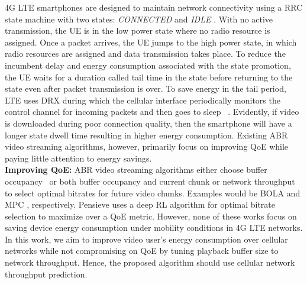 \indent \ac{4G} LTE smartphones are designed to maintain network connectivity using a \ac{RRC} state machine with two states: \textit{CONNECTED} and \textit{IDLE} \cite{Huang2012}. With no active transmission, the \ac{UE} is in the low power  state where no radio resource is assigned.  Once a packet arrives, the  \ac{UE} jumps to the high power  state, in which radio resources are assigned and data transmission takes place.  To reduce the incumbent delay and energy consumption associated with the state promotion, the \ac{UE} waits for a duration called tail time in the  state before returning to the  state even after packet transmission is over. To save energy in the tail period, LTE uses  \ac{DRX} during which the cellular interface periodically monitors the control channel for incoming packets and then goes to sleep ~\cite{Huang2012}. Evidently, if video is downloaded during poor connection quality, then the smartphone will have a longer  state dwell time resulting in higher energy consumption. Existing \ac{ABR} video streaming algorithms, however, primarily focus on improving \ac{QoE} while paying little attention to energy savings.\\
\noindent \textbf{Improving QoE:}
\ac{ABR} video streaming algorithms either choose buffer occupancy~\cite{Huang2014,Spiteri2016}  or both buffer occupancy and current chunk or network throughput~\cite{Yin2015,Jiang2014,Sengupta2018,Xu2015,Mehr2019} to select optimal bitrates for future video chunks. Examples would be BOLA \cite{Spiteri2016} and MPC \cite{Yin2015}, respectively.
Pensieve \cite{mao2017neural} uses a deep RL algorithm for optimal bitrate selection to maximize over a \ac{QoE} metric. However, none of these  works focus on saving device energy consumption under mobility conditions in \ac{4G} LTE networks. \\
\indent In this work, we aim to improve video user's energy consumption over cellular networks while not compromising on \ac{QoE} by tuning playback buffer size to network throughput. Hence, the proposed algorithm should use cellular network throughput prediction.
